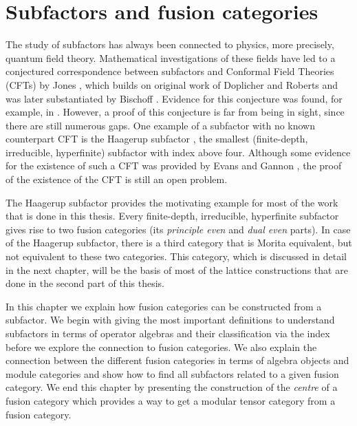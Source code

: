 \chapter{Subfactors and fusion categories}
\label{ch:subfactor}

The study of subfactors \cite{araki_subfactors_1994,Jones1997} has always been connected to physics, more precisely, quantum field theory. Mathematical investigations of these fields have led to a conjectured correspondence between subfactors and Conformal Field Theories (CFTs) by Jones \cite{Jones1990,Jones2014}, which builds on original work of Doplicher and Roberts \cite{Doplicher1989} and was later substantiated by Bischoff \cite{Bischoff2015,Bischoff2016}. Evidence for this conjecture was found, for example, in \cite{Calegari2010,Xu2017}. However, a proof of this conjecture is far from being in sight, since there are still numerous gaps. One example of a subfactor with no known counterpart CFT is the Haagerup subfactor \cite{Haagerup1994}, the smallest (finite-depth, irreducible, hyperfinite) subfactor with index above four. Although some evidence for the existence of such a CFT was provided by Evans and Gannon \cite{Evans2011}, the proof of the existence of the CFT is still an open problem.

The Haagerup subfactor provides the motivating example for most of the work that is done in this thesis. Every finite-depth, irreducible, hyperfinite subfactor gives rise to two fusion categories (its \emph{principle even} and \emph{dual even} parts). In case of the Haagerup subfactor, there is a third category that is Morita equivalent, but not equivalent to these two categories. This category, which is discussed in detail in the next chapter, will be the basis of most of the lattice constructions that are done in the second part of this thesis. 

In this chapter we explain how fusion categories can be constructed from a subfactor. We begin with giving the most important definitions to understand subfactors in terms of operator algebras and their classification via the index before we explore the connection to fusion categories. We also explain the connection between the different fusion categories in terms of algebra objects and module categories and show how to find all subfactors related to a given fusion category. We end this chapter by presenting the construction of the \emph{centre} of a fusion category which provides a way to get a modular tensor category from a fusion category.


